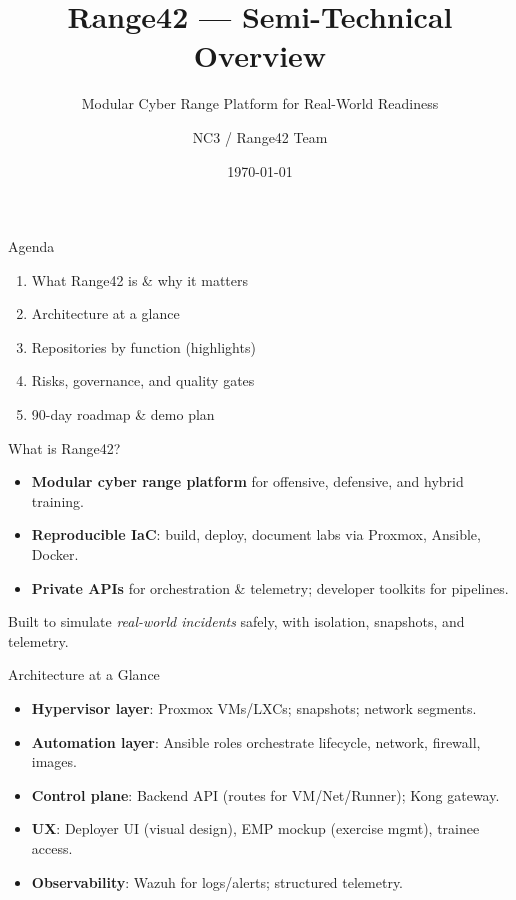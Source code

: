 \documentclass[aspectratio=169]{beamer}
\title{\faIcon{shield-alt}\; Range42 — Semi-Technical Overview}
\subtitle{Modular Cyber Range Platform for Real-World Readiness}
\author{NC3 / Range42 Team}
\date{\today}
\institute{\faServer\; Proxmox \quad \faCogs\; Ansible \quad \faProjectDiagram\; Orchestration \quad \faBinoculars\; Telemetry}
\begin{document}
\begin{frame}
  \titlepage
\end{frame}

\begin{frame}{Agenda}
  \begin{enumerate}
    \item What Range42 is \& why it matters
    \item Architecture at a glance
    \item Repositories by function (highlights)
    \item Risks, governance, and quality gates
    \item 90-day roadmap \& demo plan
  \end{enumerate}
\end{frame}

\begin{frame}{What is Range42?}
  \begin{itemize}
    \item \textbf{Modular cyber range platform} for offensive, defensive, and hybrid training.
    \item \textbf{Reproducible IaC}: build, deploy, document labs via Proxmox, Ansible, Docker.
    \item \textbf{Private APIs} for orchestration \& telemetry; developer toolkits for pipelines.
  \end{itemize}
  \begin{tcolorbox}
    \faInfoCircle\; Built to simulate \emph{real-world incidents} safely, with isolation, snapshots, and telemetry.
  \end{tcolorbox}
\end{frame}

\begin{frame}{Architecture at a Glance}
  \begin{itemize}
    \item \textbf{Hypervisor layer}: Proxmox VMs/LXCs; snapshots; network segments.
    \item \textbf{Automation layer}: Ansible roles orchestrate lifecycle, network, firewall, images.
    \item \textbf{Control plane}: Backend API (routes for VM/Net/Runner); Kong gateway.
    \item \textbf{UX}: Deployer UI (visual design), EMP mockup (exercise mgmt), trainee access.
    \item \textbf{Observability}: Wazuh for logs/alerts; structured telemetry.
  \end{itemize}
\end{frame}
\end{document}
